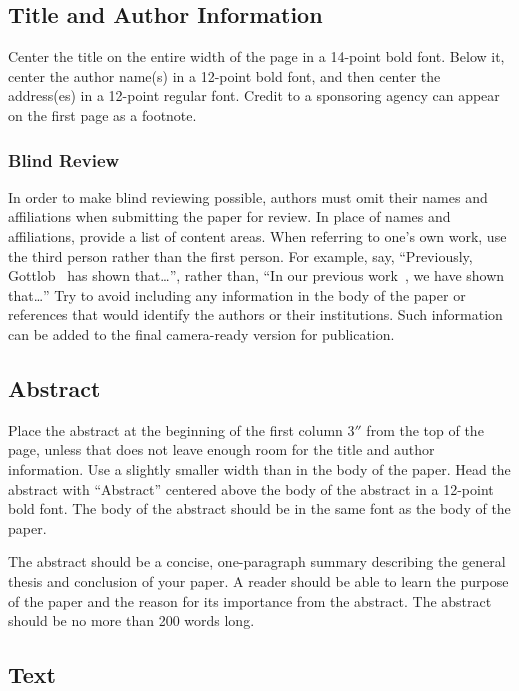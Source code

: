 \documentclass{article}
\theoremstyle{definition}
\begin{document}
\subsection{Title and Author Information}

Center the title on the entire width of the page in a 14-point bold
font. Below it, center the author name(s) in a 12-point bold font, and
then center the address(es) in a 12-point regular font. Credit to a
sponsoring agency can appear on the first page as a footnote.

\subsubsection{Blind Review}

In order to make blind reviewing possible, authors must omit their
names and affiliations when submitting the paper for review. In place
of names and affiliations, provide a list of content areas. When
referring to one's own work, use the third person rather than the
first person. For example, say, ``Previously,
Gottlob~ has shown that\ldots'', rather
than, ``In our previous work~\cite{gottlob:nonmon}, we have shown
that\ldots'' Try to avoid including any information in the body of the
paper or references that would identify the authors or their
institutions. Such information can be added to the final camera-ready
version for publication.

\subsection{Abstract}

Place the abstract at the beginning of the first column 3$''$ from the
top of the page, unless that does not leave enough room for the title
and author information. Use a slightly smaller width than in the body
of the paper. Head the abstract with ``Abstract'' centered above the
body of the abstract in a 12-point bold font. The body of the abstract
should be in the same font as the body of the paper.

The abstract should be a concise, one-paragraph summary describing the
general thesis and conclusion of your paper. A reader should be able
to learn the purpose of the paper and the reason for its importance
from the abstract. The abstract should be no more than 200 words long.

\subsection{Text}
\end{document}
